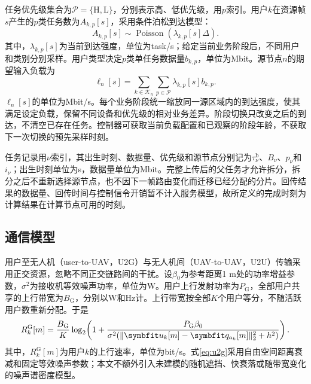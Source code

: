 任务优先级集合为$\mathcal P=\{\mathrm H,\mathrm L\}$，分别表示高、低优先级，用$p$索引。用户$k$在资源帧$s$产生的$p$类任务数为$A_{k,p}[s]$，采用条件泊松到达模型：
\begin{equation}
 A_{k,p}[s]\sim\operatorname{Poisson}(\lambda_{k,p}[s]\Delta).
 \label{eq:arrival}
\end{equation}
其中，$\lambda_{k,p}[s]$为当前到达强度，单位为task/s；给定当前业务阶段后，不同用户和类别分别采样。用户类型决定$p$类单任务数据量$b_{k,p}$，单位为Mbit。源节点$n$的期望输入负载为
\begin{equation}
 \ell_n[s]=\sum_{k\in\mathcal K_n}\sum_{p\in\mathcal P}
 \lambda_{k,p}[s]b_{k,p}.
 \label{eq:load}
\end{equation}
$\ell_n[s]$的单位为Mbit/s。每个业务阶段统一缩放同一源区域内的到达强度，使其满足设定负载，保留不同设备和优先级的相对业务差异。阶段切换只改变之后的到达，不清空已存在任务。控制器可获取当前负载配置和已观察的阶段年龄，不获取下一次切换的预先采样时刻。

任务记录用$\nu$索引，其出生时刻、数据量、优先级和源节点分别记为$\tau_\nu^{\mathrm b}$、$B_\nu$、$p_\nu$和$i_\nu$；出生时刻单位为s，数据量单位为Mbit。完整上传后的父任务才允许拆分，拆分之后不重新选择源节点，也不因下一帧路由变化而迁移已经分配的分片。回传结果的数据量、回传时间与控制信令开销暂不计入服务模型，故所定义的完成时刻为计算结果在计算节点可用的时刻。

\subsection{通信模型}
用户至无人机（user-to-UAV，U2G）与无人机间（UAV-to-UAV，U2U）传输采用正交资源，忽略不同正交链路间的干扰。设$\beta_0$为参考距离1 m处的功率增益参数，$\sigma^2$为接收机等效噪声功率，单位为W。用户上行发射功率为$P_{\mathrm G}$，全部用户共享的上行带宽为$B_{\mathrm G}$，分别以W和Hz计。上行带宽按全部$K$个用户等分，不随活跃用户数重新分配。于是
\begin{equation}
 R_k^{\mathrm G}[m]=\frac{B_{\mathrm G}}{K}
 \log_2\!\left(1+
 \frac{P_{\mathrm G}\beta_0}
 {\sigma^2(\|\vct u_k[m]-\vct q_{a_k}[m]\|_2^2+h^2)}
 \right).
 \label{eq:u2g}
\end{equation}
其中，$R_k^{\mathrm G}[m]$为用户$k$的上行速率，单位为bit/s。式\eqref{eq:u2g}采用自由空间距离衰减和固定等效噪声参数；本文不额外引入未建模的随机遮挡、快衰落或随带宽变化的噪声谱密度模型。

